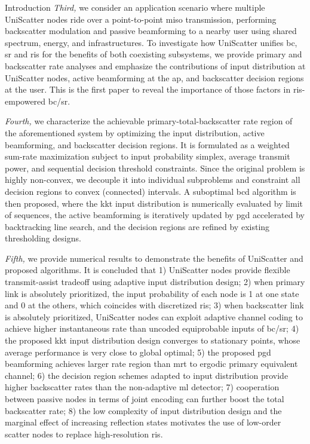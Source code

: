 \documentclass[journal]{IEEEtran}
\begin{document}
\begin{section}{Introduction}
	\emph{Third,} we consider an application scenario where multiple UniScatter nodes ride over a point-to-point \gls{miso} transmission, performing backscatter modulation and passive beamforming to a nearby user using shared spectrum, energy, and infrastructures.
	To investigate how UniScatter unifies \gls{bc}, \gls{sr} and \gls{ris} for the benefits of both coexisting subsystems, we provide primary and backscatter rate analyses and emphasize the contributions of input distribution at UniScatter nodes, active beamforming at the \gls{ap}, and backscatter decision regions at the user.
	This is the first paper to reveal the importance of those factors in \gls{ris}-empowered \gls{bc}/\gls{sr}.

	\emph{Fourth,} we characterize the achievable primary-total-backscatter rate region of the aforementioned system by optimizing the input distribution, active beamforming, and backscatter decision regions.
	It is formulated as a weighted sum-rate maximization subject to input probability simplex, average transmit power, and sequential decision threshold constraints.
	Since the original problem is highly non-convex, we decouple it into individual subproblems and constraint all decision regions to convex (connected) intervals.
	A suboptimal \gls{bcd} algorithm is then proposed, where the \gls{kkt} input distribution is numerically evaluated by limit of sequences, the active beamforming is iteratively updated by \gls{pgd} accelerated by backtracking line search, and the decision regions are refined by existing thresholding designs.

	\emph{Fifth,} we provide numerical results to demonstrate the benefits of UniScatter and proposed algorithms.
	It is concluded that 1) UniScatter nodes provide flexible transmit-assist tradeoff using adaptive input distribution design; 2) when primary link is absolutely prioritized, the input probability of each node is \num{1} at one state and \num{0} at the others, which coincides with discretized \gls{ris}; 3) when backscatter link is absolutely prioritized, UniScatter nodes can exploit adaptive channel coding to achieve higher instantaneous rate than uncoded equiprobable inputs of \gls{bc}/\gls{sr}; 4) the proposed \gls{kkt} input distribution design converges to stationary points, whose average performance is very close to global optimal; 5) the proposed \gls{pgd} beamforming achieves larger rate region than \gls{mrt} to ergodic primary equivalent channel; 6) the decision region schemes adapted to input distribution provide higher backscatter rates than the non-adaptive \gls{ml} detector; 7) cooperation between passive nodes in terms of joint encoding can further boost the total backscatter rate; 8) the low complexity of input distribution design and the marginal effect of increasing reflection states motivates the use of low-order scatter nodes to replace high-resolution \gls{ris}.


\end{section}
\end{document}
